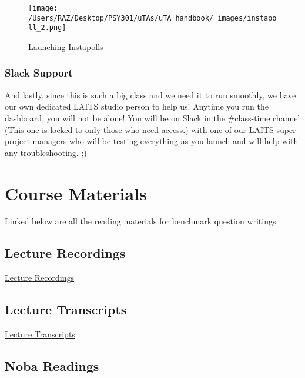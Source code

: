 \documentclass[
]{article}
\begin{document}
\begin{figure}
\centering
\texttt{[image: /Users/RAZ/Desktop/PSY301/uTAs/uTA\_handbook/\_images/instapoll\_2.png]}
\caption{Launching Instapolls}
\end{figure}

\hypertarget{slack-support}{%
\subsubsection{Slack Support}\label{slack-support}}

And lastly, since this is such a big class and we need it to run smoothly, we have our own dedicated LAITS studio person to help us! Anytime you run the dashboard, you will not be alone! You will be on Slack in the \#class-time channel (This one is locked to only those who need access.) with one of our LAITS super project managers who will be testing everything as you launch and will help with any troubleshooting. ;)

\hypertarget{course-materials}{%
\section{Course Materials}\label{course-materials}}

Linked below are all the reading materials for benchmark question writings.

\hypertarget{lecture-recordings}{%
\subsection{Lecture Recordings}\label{lecture-recordings}}

\href{https://utexas.instructure.com/courses/1407493/modules}{Lecture Recordings}

\hypertarget{lecture-transcripts}{%
\subsection{Lecture Transcripts}\label{lecture-transcripts}}

\href{https://utexas.app.box.com/folder/301841199745?s=h9lcrvgqmm9zi43g8qo8ctfzcz4yq7wt}{Lecture Transcripts}

\hypertarget{noba-readings}{%
\subsection{Noba Readings}\label{noba-readings}}
\end{document}
